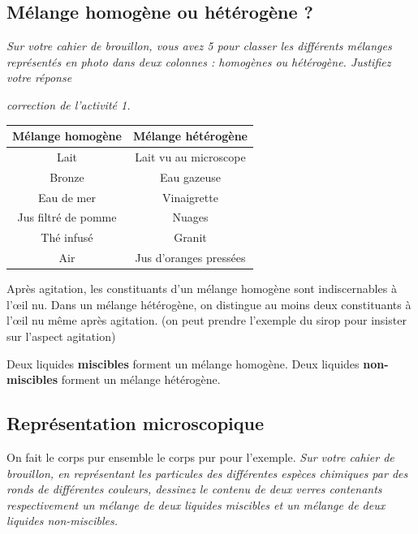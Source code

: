 \subsection{Mélange homogène ou hétérogène ?}

\begin{prior}
\emph{Sur votre cahier de brouillon, vous avez \unit{5}{\minute} pour classer les différents mélanges représentés en photo dans deux colonnes : homogènes ou hétérogène.
Justifiez votre réponse}
\end{prior}

\begin{exemple}
\emph{correction de l'activité 1.}
\center
\begin{tabular}{c|c}
\textbf{Mélange homogène} & \textbf{Mélange hétérogène} \\
\hline
Lait                & Lait vu au microscope \\
Bronze              & Eau gazeuse \\
Eau de mer          & Vinaigrette \\
Jus filtré de pomme & Nuages \\
Thé infusé          & Granit \\
Air                 & Jus d'oranges pressées
\end{tabular}
\end{exemple}

Après agitation, les constituants d'un mélange homogène sont indiscernables à l'œil nu.
Dans un mélange hétérogène, on distingue au moins deux constituants à l'œil nu même après agitation.
(on peut prendre l'exemple du sirop pour insister sur l'aspect agitation)

\begin{definition}
Deux liquides \textbf{miscibles} forment un mélange homogène.
Deux liquides \textbf{non-miscibles} forment un mélange hétérogène.
\end{definition}

\subsection{Représentation microscopique}

\begin{prior}
On fait le corps pur ensemble le corps pur pour l'exemple.
\emph{Sur votre cahier de brouillon, en représentant les particules des différentes espèces chimiques par des ronds de différentes couleurs, dessinez le contenu de deux verres contenants respectivement un mélange de deux liquides miscibles et un mélange de deux liquides non-miscibles.}
\end{prior}

